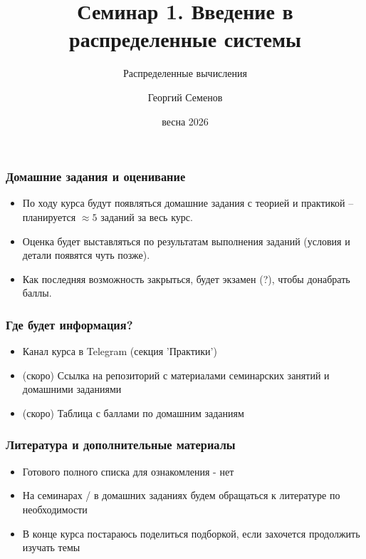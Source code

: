 \documentclass{beamer}
\title{Семинар 1. Введение в распределенные системы}
\subtitle{Распределенные вычисления}
\author{Георгий Семенов}
\institute{Институт прикладных компьютерных наук \\ Университет ИТМО}
\date{весна 2026}
\begin{document}
\frame{\titlepage}

\begin{frame}
\frametitle{Домашние задания и оценивание}

\begin{itemize}
	\item По ходу курса будут появляться домашние задания с теорией и практикой – планируется $\approx 5$ заданий за весь курс.
	\item Оценка будет выставляться по результатам выполнения заданий (условия и детали появятся чуть позже).
	\item Как последняя возможность закрыться, будет экзамен (?), чтобы донабрать баллы.
\end{itemize}

\end{frame}

\begin{frame}
\frametitle{Где будет информация?}

\begin{itemize}
	\item Канал курса в Telegram (секция 'Практики')
	\item (скоро) Ссылка на репозиторий с материалами семинарских занятий и домашними заданиями
	\item (скоро) Таблица с баллами по домашним заданиям
\end{itemize}

\end{frame}

\begin{frame}
\frametitle{Литература и дополнительные материалы}

\begin{itemize}
	\item Готового полного списка для ознакомления - нет
	\item На семинарах / в домашних заданиях будем обращаться к литературе по необходимости
	\item В конце курса постараюсь поделиться подборкой, если захочется продолжить изучать темы
\end{itemize}

\end{frame}
\end{document}
